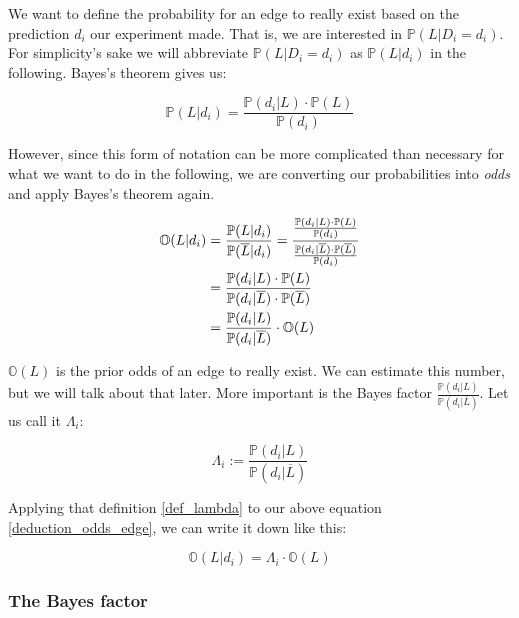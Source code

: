 \documentclass{scrartcl}
\newcommand{\prob}{\mathbb{P}}
\newcommand{\odds}{\mathbb{O}}
\begin{document}
We want to define the probability for an edge to really exist based on the prediction $d_i$ our experiment made. That is, we are interested in $\prob(L|D_i = d_i)$. For simplicity's sake we will abbreviate $\prob(L|D_i = d_i)$ as $\prob(L|d_i)$ in the following. Bayes's theorem gives us:

$$\prob(L|d_i) = \frac{\prob(d_i|L)\cdot \prob(L)}{\prob(d_i)}$$

However, since this form of notation can be more complicated than necessary for what we want to do in the following, we are converting our probabilities into \textit{odds} and apply Bayes's theorem again.

\begin{align}
\odds(L|d_i) &= \frac{\prob(L|d_i)}{\prob(\overline{L}|d_i)} = \frac{\frac{\prob(d_i|L)\cdot \prob(L)}{\prob(d_i)}}{\frac{\prob(d_i|\overline{L})\cdot \prob(\overline{L})}{\prob(d_i)}} \notag\\
 &= \frac{\prob(d_i|L)\cdot \prob(L)}{\prob(d_i|\overline{L}) \cdot \prob(\overline{L})} \notag\\
 &= \frac{\prob(d_i|L)}{\prob(d_i|\overline{L})} \cdot \odds(L) 
 \label{deduction_odds_edge}
\end{align}

$\odds(L)$ is the prior odds of an edge to really exist. We can estimate this number, but we will talk about that later. More important is the Bayes factor $\frac{\prob(d_i|L)}{\prob(d_i|\overline{L})}$. Let us call it $\Lambda_i$:

\begin{equation}
\label{def_lambda}
\Lambda_i := \frac{\prob(d_i|L)}{\prob(d_i|\overline{L})}
\end{equation}

Applying that definition \eqref{def_lambda} to our above equation \eqref{deduction_odds_edge}, we can write it down like this:

\begin{equation}
\label{odds_of_edge_pos}
\odds(L|d_i) = \Lambda_i \cdot \odds(L)
\end{equation}


\subsubsection{The Bayes factor}
\label{bayes_factor}
\end{document}
